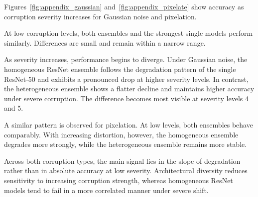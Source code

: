 
Figures~\ref{fig:appendix_gaussian} and~\ref{fig:appendix_pixelate} show accuracy as corruption severity increases for Gaussian noise and pixelation.

At low corruption levels, both ensembles and the strongest single models perform similarly. 
Differences are small and remain within a narrow range. 

As severity increases, performance begins to diverge. 
Under Gaussian noise, the homogeneous ResNet ensemble follows the degradation pattern of the single ResNet-50 and exhibits a pronounced drop at higher severity levels. 
In contrast, the heterogeneous ensemble shows a flatter decline and maintains higher accuracy under severe corruption. 
The difference becomes most visible at severity levels 4 and 5.

A similar pattern is observed for pixelation. 
At low levels, both ensembles behave comparably. 
With increasing distortion, however, the homogeneous ensemble degrades more strongly, while the heterogeneous ensemble remains more stable. 

Across both corruption types, the main signal lies in the slope of degradation rather than in absolute accuracy at low severity. 
Architectural diversity reduces sensitivity to increasing corruption strength, whereas homogeneous ResNet models tend to fail in a more correlated manner under severe shift.